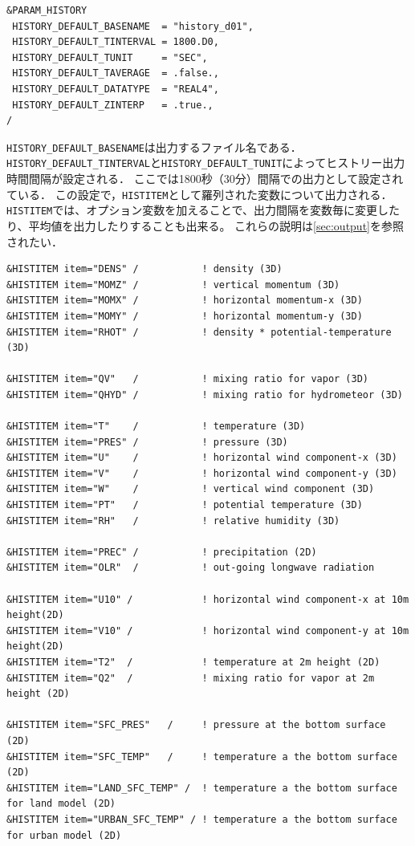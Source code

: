 \begin{verbatim}
&PARAM_HISTORY
 HISTORY_DEFAULT_BASENAME  = "history_d01",
 HISTORY_DEFAULT_TINTERVAL = 1800.D0,
 HISTORY_DEFAULT_TUNIT     = "SEC",
 HISTORY_DEFAULT_TAVERAGE  = .false.,
 HISTORY_DEFAULT_DATATYPE  = "REAL4",
 HISTORY_DEFAULT_ZINTERP   = .true.,
/
\end{verbatim}

\verb|HISTORY_DEFAULT_BASENAME|は出力するファイル名である．
\verb|HISTORY_DEFAULT_TINTERVAL|と\verb|HISTORY_DEFAULT_TUNIT|によってヒストリー出力時間間隔が設定される．
ここでは1800秒（30分）間隔での出力として設定されている．
この設定で，\verb|HISTITEM|として羅列された変数について出力される．
\verb|HISTITEM|では、オプション変数を加えることで、出力間隔を変数毎に変更したり、平均値を出力したりすることも出来る。
これらの説明は\ref{sec:output}を参照されたい．

\begin{verbatim}
&HISTITEM item="DENS" /           ! density (3D)
&HISTITEM item="MOMZ" /           ! vertical momentum (3D)
&HISTITEM item="MOMX" /           ! horizontal momentum-x (3D)
&HISTITEM item="MOMY" /           ! horizontal momentum-y (3D)
&HISTITEM item="RHOT" /           ! density * potential-temperature (3D)

&HISTITEM item="QV"   /           ! mixing ratio for vapor (3D)
&HISTITEM item="QHYD" /           ! mixing ratio for hydrometeor (3D)

&HISTITEM item="T"    /           ! temperature (3D)
&HISTITEM item="PRES" /           ! pressure (3D)
&HISTITEM item="U"    /           ! horizontal wind component-x (3D)
&HISTITEM item="V"    /           ! horizontal wind component-y (3D)
&HISTITEM item="W"    /           ! vertical wind component (3D)
&HISTITEM item="PT"   /           ! potential temperature (3D)
&HISTITEM item="RH"   /           ! relative humidity (3D)

&HISTITEM item="PREC" /           ! precipitation (2D)
&HISTITEM item="OLR"  /           ! out-going longwave radiation

&HISTITEM item="U10" /            ! horizontal wind component-x at 10m height(2D)
&HISTITEM item="V10" /            ! horizontal wind component-y at 10m height(2D)
&HISTITEM item="T2"  /            ! temperature at 2m height (2D)
&HISTITEM item="Q2"  /            ! mixing ratio for vapor at 2m height (2D)

&HISTITEM item="SFC_PRES"   /     ! pressure at the bottom surface (2D)
&HISTITEM item="SFC_TEMP"   /     ! temperature a the bottom surface (2D)
&HISTITEM item="LAND_SFC_TEMP" /  ! temperature a the bottom surface for land model (2D)
&HISTITEM item="URBAN_SFC_TEMP" / ! temperature a the bottom surface for urban model (2D)

\end{verbatim}



